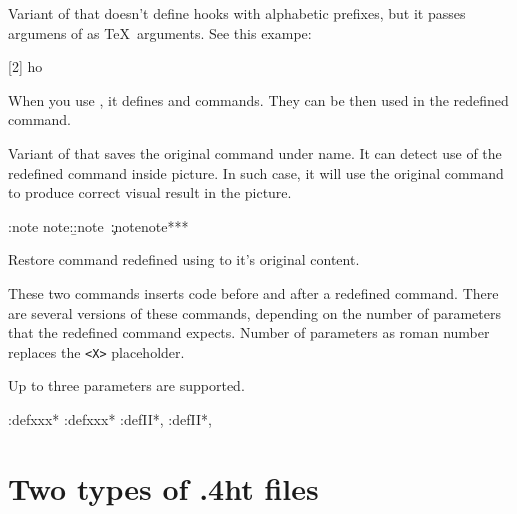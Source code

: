 Variant of  that doesn't define hooks with 
alphabetic prefixes, but it passes argumens of 
as \TeX\ arguments. See this exampe:

\begin{texsource}
[2]{\def\hookI{#1}\def\hookII{#2}}
\def\try#1{\hookI#1\hookII}
\try{ho} 
\end{texsource}

When you use , it defines  and 
commands. They can be then used in the redefined  command.


Variant of  that saves the original command under  name.
It can detect use of the redefined command inside picture. In such case, it will use
the original command to produce correct visual result in the picture.

\begin{texsource}
\def\:tempa#1{\a:note note:\b:note~#1\c:note}
\HLet\note\:tempa
\Configure{note}{*}{*}{*}
\end{texsource}


Restore command redefined using  to it's original content.



These two commands inserts code before and after a redefined command. There are several
versions of these commands, depending on the number of parameters that the redefined 
command expects. Number of parameters as roman number replaces the \verb|<X>| placeholder. 

Up to three parameters are supported.


\begin{texsource}
\newcommand\bar{xxx}
\pend:def\bar{*}
\append:def\bar{*}
\newcommand\foo[2]{#1, #2}
\pend:defII\foo{*}
\append:defII\foo{*}
\end{texsource}


\section{Two types of .4ht files}

